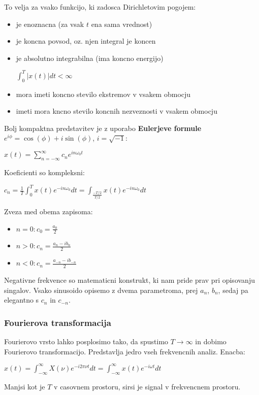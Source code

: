 \documentclass{article}
\begin{document}
\begin{multicols}{4}
To velja za vsako funkcijo, ki zadosca Dirichletovim pogojem:
\begin{itemize}
    \item je enoznacna (za vsak $t$ ena sama vrednost)
    \item je koncna povsod, oz. njen integral je koncen
    \item je absolutno integrabilna (ima koncno energijo)
        \begin{center}
            $\int_0^T |x(t)| dt < \infty$
        \end{center}
    \item mora imeti koncno stevilo ekstremov v vsakem obmocju
    \item imeti mora kncno stevilo koncnih nezveznosti v vsakem obmocju
\end{itemize}

Bolj kompaktna predstavitev je z uporabo \textbf{Eulerjeve formule} $e^{i \phi} = \cos(\phi) + i \sin(\phi)$, $i = \sqrt{-1}$:
\begin{center}
    \begin{math}
        x(t) = \sum_{n = - \infty}^{\infty} c_n e^{i n \omega_0 t}
    \end{math}
\end{center}
Koeficienti so kompleksni:
\begin{center}
    \begin{math}
        c_n = \frac{1}{T} \int_0^T x(t)e^{-in \omega_0} dt = \int_{\frac{-T/2}{T/2}} x(t) e^{-in \omega_0} dt
    \end{math}
\end{center}
Zveza med obema zapisoma:
\begin{itemize}
    \item $n = 0: c_0 = \frac{a_0}{2}$
    \item $n > 0: c_n = \frac{a_n - i b_n}{2}$
    \item $n < 0: c_n = \frac{a_{-n} - i b_{-n}}{2}$
\end{itemize}

Negativne frekvence so matematicni konstrukt, ki nam pride prav pri opisovanju singalov.
Vsako sinusoido opisemo z dvema parametroma, prej $a_n$, $b_n$, sedaj pa elegantno
s $c_n$ in $c_{-n}$.

\subsubsection{Fourierova transformacija}
Fourierovo vrsto lahko posplosimo tako, da spustimo $T \rightarrow \infty$ in dobimo Fourierovo transformacijo.
Predstavlja jedro vseh frekvencnih analiz.
Enacba:
\begin{center}
    \begin{math}
        x(t) = \int_{-\infty}^{\infty} X(\nu)e^{-i2 \pi \nu t} dt = \int_{-\infty}^{\infty} x(t) e^{-i \omega t} dt
    \end{math}
\end{center}
Manjsi kot je $T$ v casovnem prostoru, sirsi je signal v frekvencnem prostoru.


\end{multicols}
\end{document}
